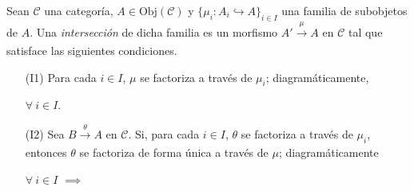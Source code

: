 \documentclass[tesis]{subfiles}
\begin{document}
\begin{Def}\label{Def: Intersección}
    Sean $\mathscr{C}$ una categoría, $A\in\text{Obj}(\mathscr{C})$ y $\{\mu_i:A_i\hookrightarrow A\}_{i\in I}$ una familia de subobjetos de $A$. Una \emph{intersección} de dicha familia es un morfismo $A'\xrightarrow[]{\mu}A$ en $\mathscr{C}$ tal que satisface las siguientes condiciones.

    \begin{itemize}
    
        \item[(I1)] Para cada $i\in I$, $\mu$ se factoriza a través de $\mu_i$; diagramáticamente,
            \begin{center}
                \quad $\forall \ i\in I$.
            \end{center}

        \item[(I2)] Sea $B\xrightarrow[]{\theta}A$ en $\mathscr{C}$. Si, para cada $i\in I$, $\theta$ se factoriza a través de $\mu_i$, entonces $\theta$ se factoriza de forma única a través de $\mu$; diagramáticamente
            \begin{center}
                \quad $\forall \ i\in I$ \quad $\implies$ \quad
            \end{center}
            
            
    \end{itemize}
\end{Def}
\end{document}
